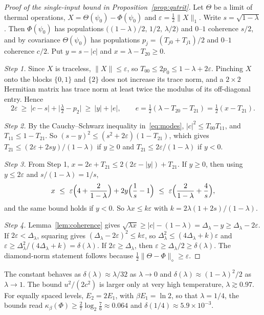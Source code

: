 \documentclass[11pt]{article}
\theoremstyle{definition}
\theoremstyle{remark}
\newcommand{\Trt}{\kappa_\beta}
\begin{document}
\begin{proof}[Proof of the single-input bound in Proposition~\ref{prop:qutrit}]
Let $\Theta$ be a limit of thermal operations, $X=\Theta(\psi_0)-\Phi(\psi_0)$ and $\varepsilon=\frac12\|X\|_1$. Write $s=\sqrt{1-\lambda}$. Then $\Phi(\psi_0)$ has populations $\bigl((1-\lambda)/2,\,1/2,\,\lambda/2\bigr)$ and $0$--$1$ coherence $s/2$, and by covariance $\Theta(\psi_0)$ has populations $p_j=(T_{j0}+T_{j1})/2$ and $0$--$1$ coherence $c/2$. Put $y=s-|c|$ and $x=\lambda-T_{20}\ge0$.

\emph{Step 1.} Since $X$ is traceless, $\|X\|\le\varepsilon$, so $T_{00}\le2p_0\le1-\lambda+2\varepsilon$. Pinching $X$ onto the blocks $\{0,1\}$ and $\{2\}$ does not increase its trace norm, and a $2\times2$ Hermitian matrix has trace norm at least twice the modulus of its off-diagonal entry. Hence
\[
2\varepsilon\ \ge\ |c-s|+\bigl|\tfrac\lambda2-p_2\bigr|\ \ge\ |y|+|e|,\qquad e=\tfrac12(\lambda-T_{20}-T_{21})=\tfrac12(x-T_{21}).
\]

\emph{Step 2.} By the Cauchy--Schwarz inequality in~\eqref{eq:modes}, $|c|^2\le T_{00}T_{11}$, and $T_{11}\le1-T_{21}$. So $(s-y)^2\le(s^2+2\varepsilon)(1-T_{21})$, which gives $T_{21}\le(2\varepsilon+2sy)/(1-\lambda)$ if $y\ge0$ and $T_{21}\le2\varepsilon/(1-\lambda)$ if $y<0$.

\emph{Step 3.} From Step 1, $x=2e+T_{21}\le2(2\varepsilon-|y|)+T_{21}$. If $y\ge0$, then using $y\le2\varepsilon$ and $s/(1-\lambda)=1/s$,
\[
x\ \le\ \varepsilon\Bigl(4+\frac2{1-\lambda}\Bigr)+2y\Bigl(\frac1s-1\Bigr)\ \le\ \varepsilon\Bigl(\frac2{1-\lambda}+\frac4s\Bigr),
\]
and the same bound holds if $y<0$. So $\lambda x\le k\varepsilon$ with $k=2\lambda(1+2s)/(1-\lambda)$.

\emph{Step 4.} Lemma~\ref{lem:coherence} gives $\sqrt{\lambda x}\ge|c|-(1-\lambda)=\Delta_\lambda-y\ge\Delta_\lambda-2\varepsilon$. If $2\varepsilon<\Delta_\lambda$, squaring gives $(\Delta_\lambda-2\varepsilon)^2\le k\varepsilon$, so $\Delta_\lambda^2\le(4\Delta_\lambda+k)\varepsilon$ and $\varepsilon\ge\Delta_\lambda^2/(4\Delta_\lambda+k)=\delta(\lambda)$. If $2\varepsilon\ge\Delta_\lambda$, then $\varepsilon\ge\Delta_\lambda/2\ge\delta(\lambda)$. The diamond-norm statement follows because $\frac12\|\Theta-\Phi\|_\diamond\ge\varepsilon$.
\end{proof}

The constant behaves as $\delta(\lambda)\approx\lambda/32$ as $\lambda\to0$ and $\delta(\lambda)\approx(1-\lambda)^2/2$ as $\lambda\to1$. The bound $u^2/(2c^2)$ is larger only at very high temperature, $\lambda\gtrsim0.97$. For equally spaced levels, $E_2=2E_1$, with $\beta E_1=\ln2$, so that $\lambda=1/4$, the bounds read $\Trt(\Phi)\ge\frac27\log_2\frac76\approx0.064$ and $\delta(1/4)\approx5.9\times10^{-3}$.
\end{document}
